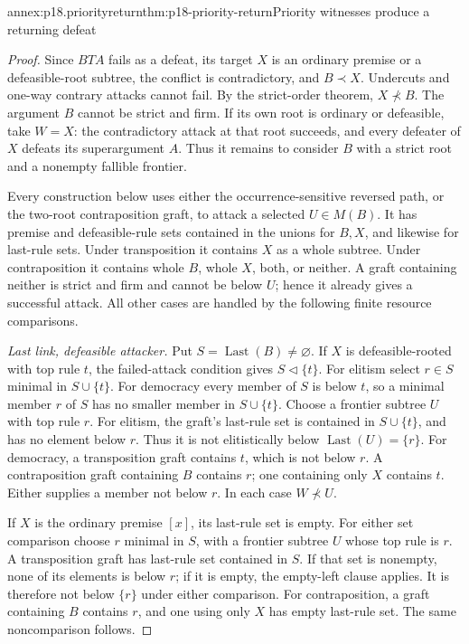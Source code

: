 \begin{annexitem}{annex:p18.priorityreturn}{thm:p18-priority-return}{Priority witnesses produce a returning defeat}
\begin{proof}
Since \(B T A\) fails as a defeat, its target \(X\) is an ordinary
premise or a defeasible-root subtree, the conflict is contradictory,
and \(B\prec X\). Undercuts and one-way contrary attacks cannot fail.
By the strict-order theorem, \(X\not\prec B\).
The argument \(B\) cannot be strict and firm.
If its own root is ordinary or defeasible, take \(W=X\):
the contradictory attack at that root succeeds, and every defeater
of \(X\) defeats its superargument \(A\).
Thus it remains to consider \(B\) with a strict root and a nonempty
fallible frontier.

Every construction below uses either the occurrence-sensitive reversed
path, or the two-root contraposition graft, to attack a selected
\(U\in M(B)\).
It has premise and defeasible-rule sets contained in the unions for
\(B,X\), and likewise for last-rule sets.
Under transposition it contains \(X\) as a whole subtree.
Under contraposition it contains whole \(B\), whole \(X\), both, or
neither. A graft containing neither is strict and firm and cannot
be below \(U\); hence it already gives a successful attack.
All other cases are handled by the following finite resource comparisons.

\emph{Last link, defeasible attacker.}
Put \(S=\operatorname{Last}(B)\ne\varnothing\).
If \(X\) is defeasible-rooted with top rule \(t\), the failed-attack
condition gives \(S\triangleleft\{t\}\).
For elitism select \(r\in S\) minimal in \(S\cup\{t\}\).
For democracy every member of \(S\) is below \(t\), so a minimal
member \(r\) of \(S\) has no smaller member in \(S\cup\{t\}\).
Choose a frontier subtree \(U\) with top rule \(r\).
For elitism, the graft's last-rule set is contained in \(S\cup\{t\}\),
and has no element below \(r\). Thus it is not elitistically below
\(\operatorname{Last}(U)=\{r\}\).
For democracy, a transposition graft contains \(t\), which is not
below \(r\). A contraposition graft containing \(B\) contains \(r\);
one containing only \(X\) contains \(t\). Either supplies a member
not below \(r\). In each case \(W\not\prec U\).

If \(X\) is the ordinary premise \([x]\), its last-rule set is empty.
For either set comparison choose \(r\) minimal in \(S\), with
a frontier subtree \(U\) whose top rule is \(r\).
A transposition graft has last-rule set contained in \(S\).
If that set is nonempty, none of its elements is below \(r\);
if it is empty, the empty-left clause applies.
It is therefore not below \(\{r\}\) under either comparison.
For contraposition, a graft containing \(B\) contains \(r\),
and one using only \(X\) has empty last-rule set.
The same noncomparison follows.


\end{proof}
\end{annexitem}
